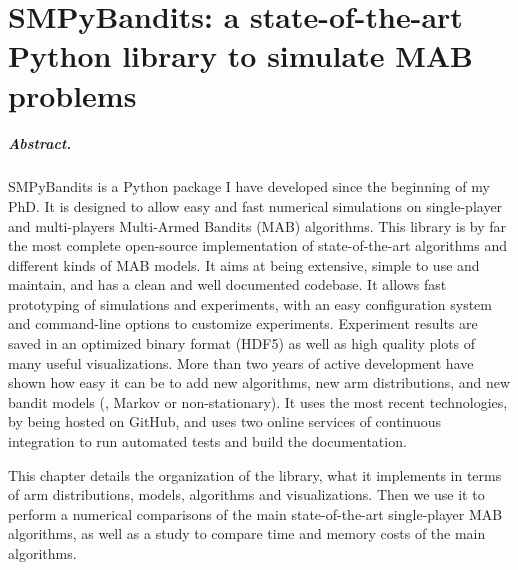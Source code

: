 
\chapter{SMPyBandits: a state-of-the-art Python library to simulate MAB problems}
\label{chapter:3}
\minitoc


\paragraph{Abstract.}
%
SMPyBandits is a Python package I have developed since the beginning of my PhD.
It is designed to allow easy and fast numerical simulations on single-player and multi-players Multi-Armed Bandits (MAB) algorithms.
This library is by far the most complete open-source implementation of state-of-the-art algorithms and different kinds of MAB models.
It aims at being extensive, simple to use and maintain, and has a clean and well documented codebase.
It allows fast prototyping of simulations and experiments, with an easy configuration system and command-line options to customize experiments.
Experiment results are saved in an optimized binary format (HDF5) as well as high quality plots of many useful visualizations.
%
More than two years of active development have shown how easy it can be to add new algorithms, new arm distributions, and new bandit models (\eg, Markov or non-stationary).
It uses the most recent technologies, by being hosted on GitHub, and uses two online services of continuous integration to run automated tests and build the documentation.

This chapter details the organization of the library, what it implements in terms of arm distributions, models, algorithms and visualizations.
Then we use it to perform a numerical comparisons of the main state-of-the-art single-player MAB algorithms, as well as a study to compare time and memory costs of the main algorithms.

\graphicspath{{2-Chapters/3-Chapter/Images/}}
\graphicspath{{2-Chapters/3-Chapter/SMPyBandits_paper.git/plots/}}


